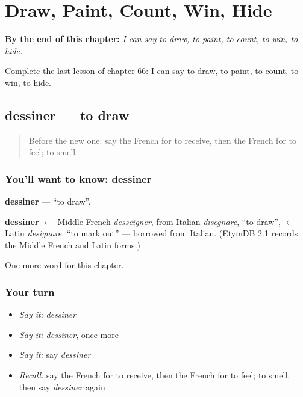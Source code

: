 
\chapter{Draw, Paint, Count, Win, Hide}
\label{ch:fr-draw-paint-count-win-hide}

\begin{chapteropening}
\textbf{By the end of this chapter:} \emph{I can say to draw, to paint, to count, to win, to hide.}

Complete the last lesson of chapter 66: I can say to draw, to paint, to count, to win, to hide.
\end{chapteropening}

\section[dessiner]{dessiner — to draw}

\label{lesson:FR-C66-dessiner}



\begin{quote}
Before the new one: say the French for to receive, then the French for to feel; to smell.
\end{quote}

\subsection*{You'll want to know: dessiner}
\textbf{dessiner} — \textquotedblleft{}to draw\textquotedblright{}.

\begin{cousinweb}
\textbf{dessiner} $\leftarrow$ Middle French \emph{desseigner}, from Italian \emph{disegnare}, \textquotedblleft{}to draw\textquotedblright{}, $\leftarrow$ Latin \emph{designare}, \textquotedblleft{}to mark out\textquotedblright{} — borrowed from Italian. (EtymDB 2.1 records the Middle French and Latin forms.)
\end{cousinweb}

\begin{grammarlens}[title={What you've built}]
One more word for this chapter.
\end{grammarlens}

\subsection*{Your turn}
\begin{itemize}
\raggedright
  \item \emph{Say it:} \emph{dessiner}
  \item \emph{Say it:} \emph{dessiner}, once more
  \item \emph{Say it:} say \emph{dessiner}
  \item \emph{Recall:} say the French for to receive, then the French for to feel; to smell, then say \emph{dessiner} again
\end{itemize}

